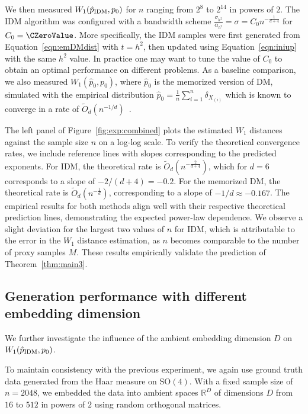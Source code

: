 \documentclass{article}
\def\phat{\hat{p}}
\newcommand{\IDM}{\textnormal{IDM}}
\begin{document}
We then measured $W_1(\hat{p}_{\IDM}, p_0)$ for $n$ ranging from $2^8$ to $2^{14}$ in powers of $2$. 
The IDM algorithm was configured with a bandwidth scheme $\displaystyle \frac{\sigma_{h^2}}{\alpha_{h^2}} =  \sigma = C_0 n^{-\frac{1}{d+4}}$ for $C_0 = \CZeroValue$. More specifically, the IDM samples were first generated from Equation~\eqref{eqn:emDMdist} with $t=h^2$, then updated using Equation~\eqref{eqn:iniup} with the same $h^2$ value.
In practice one may want to tune the value of $C_0$ to obtain an optimal performance on different problems.
As a baseline comparison, we also measured $W_1(\hat{p}_{\text{0}}, p_0)$, where $\hat{p}_{\text{0}}$ is the memorized version of DM, simulated with the empirical distribution $\phat_0=\frac{1}{n}\sum_{i=1}^n \delta_{X_{(i)}}$  which is known to converge in a rate of $\tilde{O}_{d}(n^{-1/d})$~\cite{weed2019sharp}.

The left panel of Figure~\ref{fig:exp:combined} plots the estimated $W_1$ distances against the sample size $n$ on a log-log scale. To verify the theoretical convergence rates, we include reference lines with slopes corresponding to the predicted exponents. For IDM, the theoretical rate is $\tilde{O}_{d}(n^{-\frac{2}{d+4}})$, which for $d=6$ corresponds to a slope of $-2/(d+4) = -0.2$. For the memorized DM, the theoretical rate is $\tilde{O}_{d}(n^{-\frac{1}{d}})$, corresponding to a slope of $-1/d \approx -0.167$. The empirical results for both methods align well with their respective theoretical prediction lines, demonstrating the expected power-law dependence. We observe a slight deviation for the largest two values of $n$ for IDM, which is attributable to the error in the $W_1$ distance estimation, as $n$ becomes comparable to the number of proxy samples $M$.
These results empirically validate the prediction of Theorem~\ref{thm:main3}.

\subsection{Generation performance with different embedding dimension}

We further investigate the influence of the ambient embedding dimension $D$ on $W_1(\hat{p}_{\IDM}, p_0)$.

To maintain consistency with the previous experiment, we again use ground truth data generated from the Haar measure on $\text{SO}(4)$. With a fixed sample size of $n=2048$, we embedded the data into ambient spaces $\mathbb{R}^D$ of dimensions $D$ from $16$ to $512$ in powers of $2$ using random orthogonal matrices.
\end{document}
